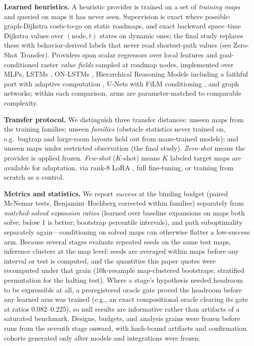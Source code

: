 \documentclass[letterpaper]{article} %
\begin{document}
\textbf{Learned heuristics.} A heuristic provider is trained on a set of \emph{training maps} and queried on maps it has never seen. Supervision is exact where possible: graph-Dijkstra costs-to-go on static roadmaps, and exact backward space--time Dijkstra values over $(\text{node},t)$ states on dynamic ones; the final study replaces these with behavior-derived labels that never read shortest-path values (see Zero-Shot Transfer). Providers span scalar regressors over local features and goal-conditioned raster \emph{value fields} sampled at roadmap nodes, implemented over MLPs, LSTMs \citep{hochreiter1997lstm}, ON-LSTMs \citep{shen2019onlstm}, Hierarchical Reasoning Models \citep[HRM;][]{wang2025hrm} including a faithful port with adaptive computation \citep{graves2016act,banino2021pondernet}, U-Nets \citep{ronneberger2015unet} with FiLM conditioning \citep{perez2018film}, and graph networks; within each comparison, arms are parameter-matched to comparable complexity.

\textbf{Transfer protocol.} We distinguish three transfer distances: unseen maps from the training families; unseen \emph{families} (obstacle statistics never trained on, e.g.\ bugtrap and large-room layouts held out from maze-trained models); and unseen maps under restricted observation (the final study). \emph{Zero-shot} means the provider is applied frozen. \emph{Few-shot} ($K$-shot) means $K$ labeled target maps are available for adaptation, via rank-8 LoRA \citep{hu2021lora}, full fine-tuning, or training from scratch as a control.

\textbf{Metrics and statistics.} We report \emph{success} at the binding budget (paired McNemar tests, Benjamini--Hochberg corrected within families) separately from \emph{matched-solved expansion ratios} (learned over baseline expansions on maps both solve; below 1 is better; bootstrap percentile intervals), and path suboptimality separately again---conditioning on solved maps can otherwise flatter a low-success arm. Because several stages evaluate repeated seeds on the same test maps, inference clusters at the map level: seeds are averaged within maps before any interval or test is computed, and the quantities this paper quotes were recomputed under that grain (10k-resample map-clustered bootstraps; stratified permutation for the halting test). Where a stage's hypothesis needed headroom to be expressible at all, a preregistered oracle gate proved the headroom before any learned arm was trained (e.g., an exact compositional oracle clearing its gate at ratios 0.082--0.225), so null results are informative rather than artifacts of a saturated benchmark. Designs, budgets, and analysis grains were frozen before runs from the seventh stage onward, with hash-bound artifacts and confirmation cohorts generated only after models and integrations were frozen.
\end{document}
